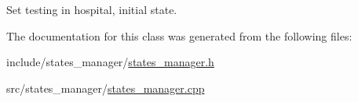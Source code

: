 Set testing in hospital, initial state. 



The documentation for this class was generated from the following files\+:\begin{DoxyCompactItemize}
\item 
include/states\+\_\+manager/\hyperlink{states__manager_8h}{states\+\_\+manager.\+h}\item 
src/states\+\_\+manager/\hyperlink{states__manager_8cpp}{states\+\_\+manager.\+cpp}\end{DoxyCompactItemize}
